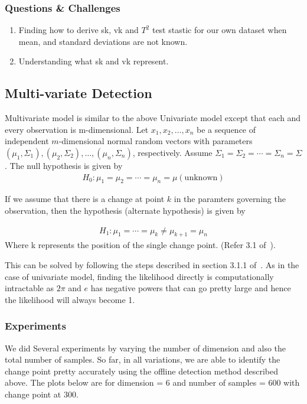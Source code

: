 \documentclass{article}
\begin{document}
\subsubsection{Questions \& Challenges}
\begin{enumerate}
  \item Finding how to derive sk, vk and $T^{2}$ test stastic for our own dataset when mean, and standard deviations are not known.
  \item Understanding what sk and vk represent.
\end{enumerate}

\subsection{Multi-variate Detection}
Multivariate model is similar to the above Univariate model except that each and every observation is m-dimensional.
Let $x_{1}, x_{2}, \ldots , x_{n}$ be a sequence of independent $m$-dimensional normal random vectors with parameters $(\mu_{1}, \Sigma_{1}), (\mu_{2}, \Sigma_{2}), \ldots, (\mu_{n}, \Sigma_{n})$, respectively.
Assume $\Sigma_{1} = \Sigma_{2} = \cdots = \Sigma_{n} = \Sigma $.
The null hypothesis is given by 
\begin{align}
H_{0} : \mu_{1} = \mu_{2} = \cdots = \mu_{n} = \mu (\mathrm{unknown})
\end{align}

If we assume that there is a change at point $k$ in the paramters governing the observation, then the hypothesis (alternate hypothesis) is given by

\begin{align}
H_{1} : \mu_{1} = \cdots = \mu_{k} \ne \mu_{k+1} = \mu_{n}
\end{align}
Where k represents the position of the single change point. (Refer 3.1 of~\cite{birkhauser_pscpa}).

This can be solved by following the steps described in section 3.1.1 of~\cite{birkhauser_pscpa}.  As in the case of univariate model, finding the likelihood directly is computationally intractable as $2\pi$ and $e$ has negative powers that can go pretty large and hence the likelihood will always become 1.

\subsubsection{Experiments}
We did Several experiments by varying the number of dimension and also the total number of samples.  So far, in all variations, we are able to identify the change point pretty accurately using the offline detection method described above.  The plots below are for dimension = 6 and number of samples = 600 with change point at 300.
\end{document}
